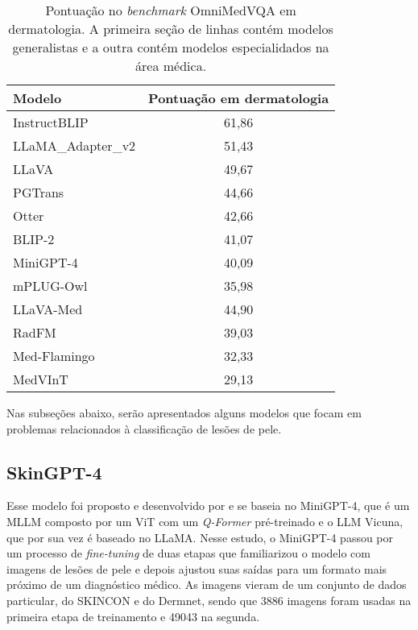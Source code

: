 \begin{table}[ht]
    \caption{\small Pontuação no \textit{benchmark} OmniMedVQA em dermatologia. A primeira seção de linhas contém modelos generalistas e a outra contém modelos especialidados
        na área médica.}
    \centering
    \begin{tabular}{l|c}
        \hline
        Modelo                  & Pontuação em dermatologia \\ \hline
        InstructBLIP            & 61,86                     \\
        \ac{LLaMA}\_Adapter\_v2 & 51,43                     \\
        \ac{LLaVA}              & 49,67                     \\
        PGTrans                 & 44,66                     \\
        Otter                   & 42,66                     \\
        BLIP-2                  & 41,07                     \\
        Mini\ac{GPT}-4          & 40,09                     \\
        mPLUG-Owl               & 35,98                     \\ \hline
        \ac{LLaVA}-Med          & 44,90                     \\
        RadFM                   & 39,03                     \\
        Med-Flamingo            & 32,33                     \\
        MedVInT                 & 29,13                     \\ \hline
    \end{tabular}
    \label{tab:omnimedvqa_dermatology_results}
\end{table}

Nas subseções abaixo, serão apresentados alguns modelos que focam em problemas relacionados à classificação de lesões de pele.

\subsection{SkinGPT-4}

Esse modelo foi proposto e desenvolvido por \textcite{zhou2023skingpt} e se baseia no Mini\ac{GPT}-4, que é um \ac{MLLM} composto por um \ac{ViT} com um \textit{Q-Former}
pré-treinado e o \ac{LLM} Vicuna, que por sua vez é baseado no \ac{LLaMA}. Nesse estudo, o Mini\ac{GPT}-4 passou por um processo de \textit{fine-tuning} de duas etapas
que familiarizou o modelo com imagens de lesões de pele e depois ajustou suas saídas para um formato mais próximo de um diagnóstico médico. As imagens vieram de um
conjunto de dados particular, do SKINCON e do Dermnet, sendo que 3886 imagens foram usadas na primeira etapa de treinamento e 49043 na segunda.

